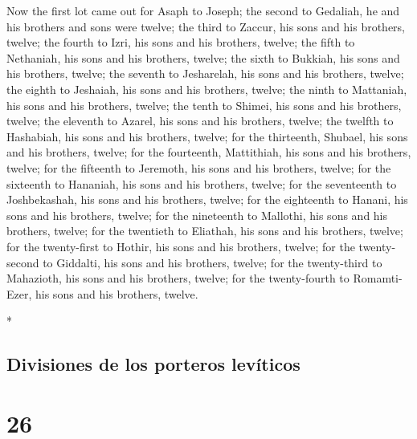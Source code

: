 \begin{paracol}{2}
\begin{otherlanguage}{english}
 Now the first lot came out for Asaph to Joseph; the
second to Gedaliah, he and his brothers and sons were twelve;
 the third to Zaccur, his sons and his brothers, twelve;
 the fourth to Izri, his sons and his brothers, twelve;
 the fifth to Nethaniah, his sons and his brothers,
twelve;  the sixth to Bukkiah, his sons and his brothers,
twelve;  the seventh to Jesharelah, his sons and his
brothers, twelve;  the eighth to Jeshaiah, his sons and
his brothers, twelve;  the ninth to Mattaniah, his sons
and his brothers, twelve;  the tenth to Shimei, his sons
and his brothers, twelve;  the eleventh to Azarel, his
sons and his brothers, twelve;  the twelfth to Hashabiah,
his sons and his brothers, twelve;  for the thirteenth,
Shubael, his sons and his brothers, twelve;  for the
fourteenth, Mattithiah, his sons and his brothers, twelve;
 for the fifteenth to Jeremoth, his sons and his
brothers, twelve;  for the sixteenth to Hananiah, his
sons and his brothers, twelve;  for the seventeenth to
Joshbekashah, his sons and his brothers, twelve;  for the
eighteenth to Hanani, his sons and his brothers, twelve; 
for the nineteenth to Mallothi, his sons and his brothers, twelve;
 for the twentieth to Eliathah, his sons and his
brothers, twelve;  for the twenty-first to Hothir, his
sons and his brothers, twelve;  for the twenty-second to
Giddalti, his sons and his brothers, twelve;  for the
twenty-third to Mahazioth, his sons and his brothers, twelve;
 for the twenty-fourth to Romamti-Ezer, his sons and his
brothers, twelve.

\end{otherlanguage}

\switchcolumn[0]*

\hypertarget{divisiones-de-los-porteros-levuxedticos}{%
\subsection{Divisiones de los porteros
levíticos}\label{divisiones-de-los-porteros-levuxedticos}}

\hypertarget{section-50}{%
\section{26}\label{section-50}}


\end{paracol}

